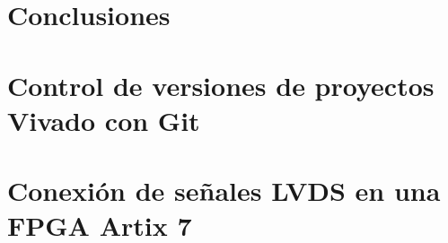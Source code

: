 \documentclass[11pt,letterpaper,oneside]{phstylee}
\begin{document}

\chapter{Conclusiones}
\label{cap:conclusiones}
%

\newpage
\thispagestyle{empty}
\cleardoublepage



\appendix
\chapter{Control de versiones de proyectos Vivado con Git}
\label{cap:git}
%

\chapter{Conexión de señales LVDS en una FPGA Artix 7}
\label{cap:lvds}
%

%
%
%



\end{document}

